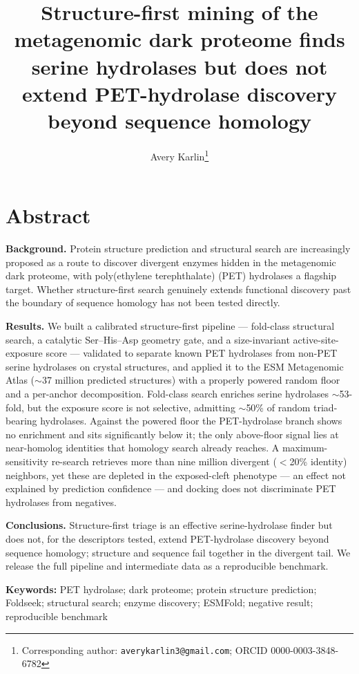 \documentclass[10pt]{article}
\title{\vspace{-1.5em}\bfseries Structure-first mining of the metagenomic dark proteome finds serine hydrolases but does not extend PET-hydrolase discovery beyond sequence homology}
\author[1,2,3]{Avery Karlin\thanks{Corresponding author: \texttt{averykarlin3@gmail.com}; ORCID 0000-0003-3848-6782}}
\affil[1]{The Annealing Signet Institute, New York, NY, USA}
\affil[2]{Department of Applied Physics and Applied Mathematics, Columbia University, New York, NY, USA}
\affil[3]{Department of Computer Science, University of Colorado Boulder, Boulder, CO, USA}
\date{}
\newcommand{\sm}{\ensuremath{\sim}}
\begin{document}
\maketitle
\vspace{-2em}

\section*{Abstract}
\noindent\textbf{Background.} Protein structure prediction and structural search are increasingly proposed as a route to discover divergent enzymes hidden in the metagenomic dark proteome, with poly(ethylene terephthalate) (PET) hydrolases a flagship target. Whether structure-first search genuinely extends functional discovery past the boundary of sequence homology has not been tested directly.

\noindent\textbf{Results.} We built a calibrated structure-first pipeline --- fold-class structural search, a catalytic Ser--His--Asp geometry gate, and a size-invariant active-site-exposure score --- validated to separate known PET hydrolases from non-PET serine hydrolases on crystal structures, and applied it to the ESM Metagenomic Atlas (\sm37 million predicted structures) with a properly powered random floor and a per-anchor decomposition. Fold-class search enriches serine hydrolases \sm53-fold, but the exposure score is not selective, admitting \sm50\% of random triad-bearing hydrolases. Against the powered floor the PET-hydrolase branch shows no enrichment and sits significantly below it; the only above-floor signal lies at near-homolog identities that homology search already reaches. A maximum-sensitivity re-search retrieves more than nine million divergent ($<$20\% identity) neighbors, yet these are depleted in the exposed-cleft phenotype --- an effect not explained by prediction confidence --- and docking does not discriminate PET hydrolases from negatives.

\noindent\textbf{Conclusions.} Structure-first triage is an effective serine-hydrolase finder but does not, for the descriptors tested, extend PET-hydrolase discovery beyond sequence homology; structure and sequence fail together in the divergent tail. We release the full pipeline and intermediate data as a reproducible benchmark.

\vspace{0.5em}
\noindent\textbf{Keywords:} PET hydrolase; dark proteome; protein structure prediction; Foldseek; structural search; enzyme discovery; ESMFold; negative result; reproducible benchmark
\end{document}
